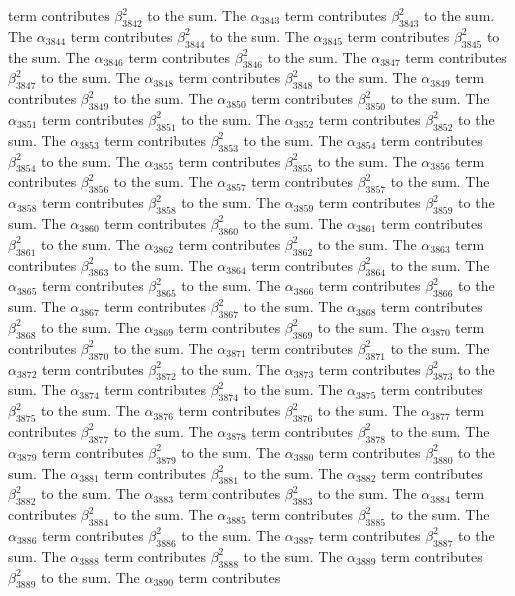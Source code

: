 \begin{lemma}
term contributes $\beta_{3842}^{2}$ to the sum. The $\alpha_{3843}$ term contributes $\beta_{3843}^{2}$ to the sum. The $\alpha_{3844}$ term contributes $\beta_{3844}^{2}$ to the sum. The $\alpha_{3845}$ term contributes $\beta_{3845}^{2}$ to the sum. The $\alpha_{3846}$ term contributes $\beta_{3846}^{2}$ to the sum. The $\alpha_{3847}$ term contributes $\beta_{3847}^{2}$ to the sum. The $\alpha_{3848}$ term contributes $\beta_{3848}^{2}$ to the sum. The $\alpha_{3849}$ term contributes $\beta_{3849}^{2}$ to the sum. The $\alpha_{3850}$ term contributes $\beta_{3850}^{2}$ to the sum. The $\alpha_{3851}$ term contributes $\beta_{3851}^{2}$ to the sum. The $\alpha_{3852}$ term contributes $\beta_{3852}^{2}$ to the sum. The $\alpha_{3853}$ term contributes $\beta_{3853}^{2}$ to the sum. The $\alpha_{3854}$ term contributes $\beta_{3854}^{2}$ to the sum. The $\alpha_{3855}$ term contributes $\beta_{3855}^{2}$ to the sum. The $\alpha_{3856}$ term contributes $\beta_{3856}^{2}$ to the sum. The $\alpha_{3857}$ term contributes $\beta_{3857}^{2}$ to the sum. The $\alpha_{3858}$ term contributes $\beta_{3858}^{2}$ to the sum. The $\alpha_{3859}$ term contributes $\beta_{3859}^{2}$ to the sum. The $\alpha_{3860}$ term contributes $\beta_{3860}^{2}$ to the sum. The $\alpha_{3861}$ term contributes $\beta_{3861}^{2}$ to the sum. The $\alpha_{3862}$ term contributes $\beta_{3862}^{2}$ to the sum. The $\alpha_{3863}$ term contributes $\beta_{3863}^{2}$ to the sum. The $\alpha_{3864}$ term contributes $\beta_{3864}^{2}$ to the sum. The $\alpha_{3865}$ term contributes $\beta_{3865}^{2}$ to the sum. The $\alpha_{3866}$ term contributes $\beta_{3866}^{2}$ to the sum. The $\alpha_{3867}$ term contributes $\beta_{3867}^{2}$ to the sum. The $\alpha_{3868}$ term contributes $\beta_{3868}^{2}$ to the sum. The $\alpha_{3869}$ term contributes $\beta_{3869}^{2}$ to the sum. The $\alpha_{3870}$ term contributes $\beta_{3870}^{2}$ to the sum. The $\alpha_{3871}$ term contributes $\beta_{3871}^{2}$ to the sum. The $\alpha_{3872}$ term contributes $\beta_{3872}^{2}$ to the sum. The $\alpha_{3873}$ term contributes $\beta_{3873}^{2}$ to the sum. The $\alpha_{3874}$ term contributes $\beta_{3874}^{2}$ to the sum. The $\alpha_{3875}$ term contributes $\beta_{3875}^{2}$ to the sum. The $\alpha_{3876}$ term contributes $\beta_{3876}^{2}$ to the sum. The $\alpha_{3877}$ term contributes $\beta_{3877}^{2}$ to the sum. The $\alpha_{3878}$ term contributes $\beta_{3878}^{2}$ to the sum. The $\alpha_{3879}$ term contributes $\beta_{3879}^{2}$ to the sum. The $\alpha_{3880}$ term contributes $\beta_{3880}^{2}$ to the sum. The $\alpha_{3881}$ term contributes $\beta_{3881}^{2}$ to the sum. The $\alpha_{3882}$ term contributes $\beta_{3882}^{2}$ to the sum. The $\alpha_{3883}$ term contributes $\beta_{3883}^{2}$ to the sum. The $\alpha_{3884}$ term contributes $\beta_{3884}^{2}$ to the sum. The $\alpha_{3885}$ term contributes $\beta_{3885}^{2}$ to the sum. The $\alpha_{3886}$ term contributes $\beta_{3886}^{2}$ to the sum. The $\alpha_{3887}$ term contributes $\beta_{3887}^{2}$ to the sum. The $\alpha_{3888}$ term contributes $\beta_{3888}^{2}$ to the sum. The $\alpha_{3889}$ term contributes $\beta_{3889}^{2}$ to the sum. The $\alpha_{3890}$ term contributes 
\end{lemma}
